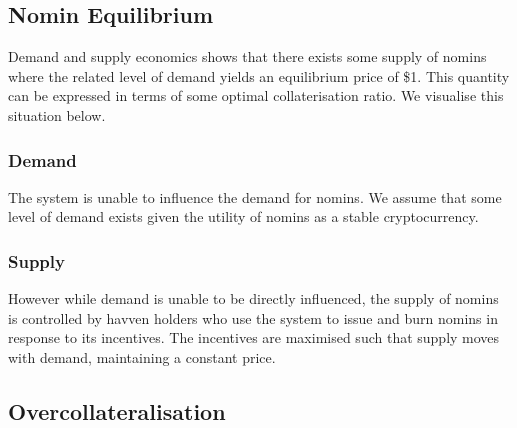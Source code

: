\newpage
\subsection{Nomin Equilibrium} Demand and supply economics shows that there exists some supply of nomins where the related level of demand yields an equilibrium price of \$1. This quantity can be expressed in terms of some optimal collaterisation ratio. We visualise this situation below. \\

\begin{center}
\end{center}
	
\subsubsection*{Demand}

\noindent The system is unable to influence the demand for nomins. We assume that some level of demand exists given the utility of nomins as a stable cryptocurrency.

\subsubsection*{Supply}

\noindent However while demand is unable to be directly influenced, the supply of nomins is controlled by havven holders who use the system to issue and burn nomins in response to its incentives. The incentives are maximised such that supply moves with demand, maintaining a constant price.\\

\subsection{Overcollateralisation}

